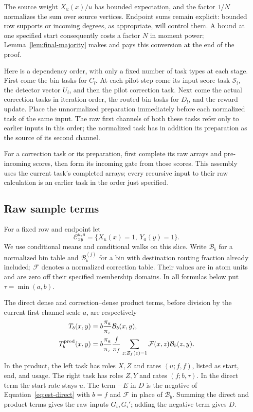 The source weight $X_u(x)/u$ has bounded expectation, and the factor
$1/N$ normalizes the sum over source vertices.  Endpoint sums remain
explicit: bounded row supports or incoming degrees, as appropriate,
will control them.  A bound at one specified start consequently costs
a factor $N$ in moment power; Lemma~\ref{lem:final-majority} makes and
pays this conversion at the end of the proof.

Here is a dependency order, with only a fixed number of task types at each
stage.  First come the bin tasks for $C_l$.  At each pilot step come its
input-score task $\mathcal S_i$, the detector vector $U_i$, and then the
pilot correction task.  Next come the actual correction tasks in iteration
order, the routed bin tasks for $D_l$, and the reward update.  Place the
unnormalized preparation immediately before each normalized task of the
same input.  The raw first channels of both these tasks refer only to
earlier inputs in this order; the normalized task has in addition its
preparation as the source of its second channel.

For a correction task or its preparation, first complete its raw arrays
and pre-incoming scores, then form its incoming gate from those scores.
This assembly uses the current task's completed arrays; every recursive
input to their raw calculation is an earlier task in the order just
specified.

\subsection{Raw sample terms}

For a fixed row and endpoint let
\[
 \mathcal C_{xy}^{u,a}=\{X_u(x)=1,\ Y_a(y)=1\}.
\]
We use conditional means and conditional walks on this slice.  Write
$\mathcal B_b$ for a normalized bin table and $\mathcal B_b^{(j)}$ for a
bin with destination routing fraction already included; $\mathcal F$
denotes a normalized correction table.  Their values are in atom units
and are zero off their specified membership domains.  In all formulas
below put $\tau=\min(a,b)$.

The direct dense and correction--dense product terms, before division by
the current first-channel scale $a$, are respectively
\begin{align}
 T_b(x,y)&=b\frac{\pi_a}{\pi_\tau}\mathcal B_b(x,y),
 \label{eq:est-direct}\\
 T_b^{\rm prod}(x,y)&=
 b\frac{\pi_a}{\pi_\tau}\frac f{\pi_f}
 \sum_{z:Z_f(z)=1}\mathcal F(x,z)\mathcal B_b(z,y).
 \label{eq:est-product}
\end{align}
In the product, the left task has roles $X,Z$ and rates
$(u;f,f)$, listed as start, end, and usage.  The right task has roles
$Z,Y$ and rates $(f;b,\tau)$.  In the direct term the start rate stays $u$.
The term $-E$ in $D$ is the negative of
Equation~\eqref{eq:est-direct} with $b=f$ and $\mathcal F$ in place of
$\mathcal B_b$.  Summing the direct and product terms gives the raw inputs
$G_i,G_i'$; adding the negative term gives $D$.

